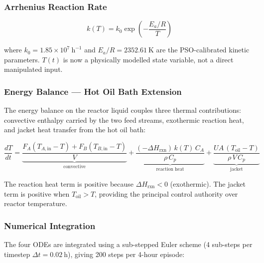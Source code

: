 \documentclass[12pt,a4paper]{article}
\begin{document}
\subsubsection{Arrhenius Reaction Rate}

\begin{equation}
  k(T) = k_0\exp\!\left(-\frac{E_a/R}{T}\right)
  \label{eq:arrhenius}
\end{equation}

where $k_0 = 1.85\times10^7\ \mathrm{h^{-1}}$ and $E_a/R = 2352.61\ \mathrm{K}$
are the PSO-calibrated kinetic parameters. $T(t)$ is now a physically modelled
state variable, not a direct manipulated input.

\subsubsection{Energy Balance — Hot Oil Bath Extension}

The energy balance on the reactor liquid couples three thermal contributions:
convective enthalpy carried by the two feed streams, exothermic reaction heat,
and jacket heat transfer from the hot oil bath:

\begin{equation}
  \frac{dT}{dt}
    = \underbrace{\frac{F_A(T_{A,\mathrm{in}}-T)+F_B(T_{B,\mathrm{in}}-T)}{V}}_{\text{convective}}
    + \underbrace{\frac{(-\Delta H_\mathrm{rxn})\,k(T)\,C_A}{\rho\,C_p}}_{\text{reaction heat}}
    + \underbrace{\frac{UA\,(T_\mathrm{oil}-T)}{\rho\,V\,C_p}}_{\text{jacket}}
  \label{eq:dT}
\end{equation}

The reaction heat term is positive because $\Delta H_\mathrm{rxn} < 0$
(exothermic). The jacket term is positive when $T_\mathrm{oil} > T$, providing
the principal control authority over reactor temperature.

\subsubsection{Numerical Integration}

The four ODEs are integrated using a sub-stepped Euler scheme (4 sub-steps per
timestep $\Delta t = 0.02\ \mathrm{h}$), giving 200 steps per 4-hour episode:
\end{document}

